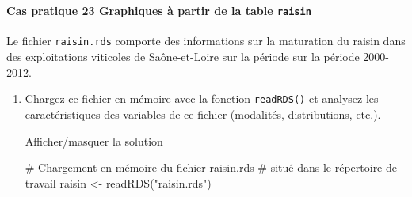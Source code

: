 \documentclass[12pt,]{article}
\newenvironment{Shaded}{}{}
\newcommand{\KeywordTok}[1]{\textcolor[rgb]{0.00,0.00,1.00}{{#1}}}
\newcommand{\StringTok}[1]{\textcolor[rgb]{0.00,0.50,0.50}{{#1}}}
\newcommand{\CommentTok}[1]{\textcolor[rgb]{0.00,0.50,0.00}{{#1}}}
\newcommand{\NormalTok}[1]{{#1}}
\let\oldparagraph\paragraph
\renewcommand{\paragraph}[1]{\oldparagraph{#1}\mbox{}}
\begin{document}
~

\paragraph{\texorpdfstring{\textbf{Cas pratique 23} Graphiques à partir
de la table
\texttt{raisin}}{Cas pratique 23 Graphiques à partir de la table raisin}}\label{cas-pratique-23-graphiques-a-partir-de-la-table-raisin}

Le fichier \texttt{raisin.rds} comporte des informations sur la
maturation du raisin dans des exploitations viticoles de Saône-et-Loire
sur la période sur la période 2000-2012.

\begin{enumerate}
\def\labelenumi{\alph{enumi}.}
\item
  Chargez ce fichier en mémoire avec la fonction \texttt{readRDS()} et
  analysez les caractéristiques des variables de ce fichier (modalités,
  distributions, etc.).

  Afficher/masquer la solution

  \hypertarget{sol70}{}
\begin{Shaded}
\begin{Highlighting}[]
\CommentTok{# Chargement en mémoire du fichier raisin.rds}
\CommentTok{# situé dans le répertoire de travail}
\NormalTok{raisin <-}\StringTok{ }\KeywordTok{readRDS}\NormalTok{(}\StringTok{"raisin.rds"}\NormalTok{)}


\end{Highlighting}
\end{Shaded}
\end{enumerate}
\end{document}
